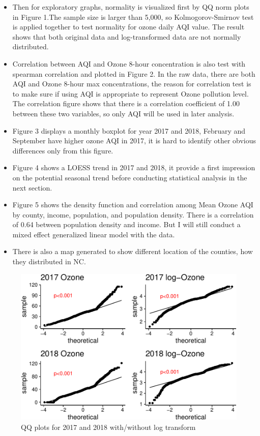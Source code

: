 \documentclass[12pt,]{article}
\begin{document}
\begin{itemize}
\item[]   Then for exploratory graphs, normality is visualized first by QQ norm plots in Figure 1.The sample size is larger than 5,000, so Kolmogorov-Smirnov test is applied together to test normality for ozone daily AQI value. The result shows that both original data and log-transformed data are not normally distributed. \
\item[] Correlation between AQI and Ozone 8-hour concentration is also test with spearman correlation and plotted in Figure 2. In the raw data, there are both AQI and Ozone 8-hour max concentrations, the reason for correlation test is to make sure if using AQI is appropriate to represent Ozone pollution level. The correlation figure shows that there is a correlation coefficient of 1.00 between these two variables, so only AQI will be used in later analysis.   
\item[] Figure 3 displays a monthly boxplot for year 2017 and 2018, February and September have higher ozone AQI in 2017, it is hard to identify other obvious differences only from this figure. \
\item[] Figure 4 shows a LOESS trend in 2017 and 2018, it provide a first impression on the potential seasonal trend before conducting statistical analysis in the next section. \
\item[] Figure 5 shows the density function and correlation among Mean Ozone AQI by county, income, population, and population density. There is a correlation of 0.64 between population density and income. But I will still conduct a mixed effect generalized linear model with the data.
\item[] There is also a map generated to show different location of the counties, how they distributed in NC.
\end{itemize}

\begin{figure}
\centering
\includegraphics{Xia_ENV_872_Project_files/figure-latex/exploration 1-1.pdf}
\caption{QQ plots for 2017 and 2018 with/without log transform}
\end{figure}
\end{document}
